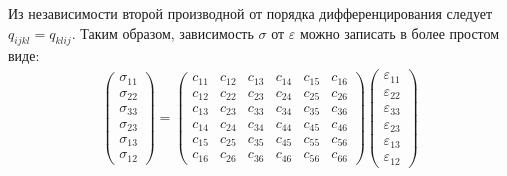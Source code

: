 Из независимости второй производной от порядка дифференцирования следует $q_{ijkl} = q_{klij}$. Таким образом, зависимость $\sigma$ от $\varepsilon$ можно записать в более простом виде:
\begin{align}
\left( \begin{array}{cccccccccccc}
\sigma_{11} \\
\sigma_{22} \\
\sigma_{33} \\
\sigma_{23} \\
\sigma_{13} \\
\sigma_{12} 
\end{array} \right){}
= \left( \begin{array}{cccccccccccc}
c_{11} & c_{12} & c_{13} & c_{14} & c_{15} & c_{16} \\ 
c_{12} & c_{22} & c_{23} & c_{24} & c_{25} & c_{26} \\ 
c_{13} & c_{23} & c_{33} & c_{34} & c_{35} & c_{36} \\ 
c_{14} & c_{24} & c_{34} & c_{44} & c_{45} & c_{46} \\ 
c_{15} & c_{25} & c_{35} & c_{45} & c_{55} & c_{56} \\ 
c_{16} & c_{26} & c_{36} & c_{46} & c_{56} & c_{66}
\end{array} \right){}
\left( \begin{array}{cccccccccccc}
\varepsilon_{11} \\
\varepsilon_{22} \\
\varepsilon_{33} \\
\varepsilon_{23} \\
\varepsilon_{13} \\
\varepsilon_{12}
\end{array} \right)
\end{align}


